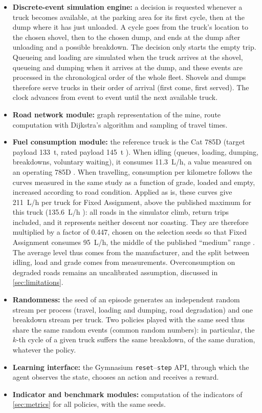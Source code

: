 \documentclass[11pt,a4paper]{article}
\newif\ifrevmarks
\newcommand{\revtag}[1]{\ifrevmarks\textsuperscript{\textcolor{red!70!black}{\scriptsize[#1]}}\fi}
\newcommand{\rev}[2]{\ifrevmarks{\color{revcolor}#2}\revtag{#1}\else#2\fi}
\newenvironment{revbloc}[1]{\par\ifrevmarks\color{revcolor}\noindent\revtag{#1}\ \fi}{\par}
\begin{document}
\begin{revbloc}{M11, A, v3}
\begin{itemize}
  \item \textbf{Discrete-event simulation engine:} a decision is requested whenever a truck becomes available, at the parking area for its first cycle, then at the dump where it has just unloaded. A cycle goes from the truck's location to the chosen shovel, then to the chosen dump, and ends at the dump after unloading and a possible breakdown. The decision only starts the empty trip. Queueing and loading are simulated when the truck arrives at the shovel, queueing and dumping when it arrives at the dump, and these events are processed in the chronological order of the whole fleet. Shovels and dumps therefore serve trucks in their order of arrival (first come, first served). The clock advances from event to event until the next available truck.
  \item \textbf{Road network module:} graph representation of the mine, route computation with Dijkstra's algorithm and sampling of travel times.
  \item \textbf{Fuel consumption module:} \rev{v3, M20}{the reference truck is the Cat 785D (target payload 133~t, rated payload 145~t \cite{Caterpillar2019,Caterpillar785D2025}). When idling (queues, loading, dumping, breakdowns, voluntary waiting), it consumes 11.3~L/h, a value measured on an operating 785D \cite{Kubler2015}. When travelling, consumption per kilometre follows the curves measured in the same study as a function of grade, loaded and empty, increased according to road condition. Applied as is, these curves give 211~L/h per truck for Fixed Assignment, above the published maximum for this truck (135.6~L/h \cite{Caterpillar2019}): all roads in the simulator climb, return trips included, and it represents neither descent nor coasting. They are therefore multiplied by a factor of 0.447, chosen on the selection seeds so that Fixed Assignment consumes 95~L/h, the middle of the published ``medium'' range \cite{Caterpillar2019}. The average level thus comes from the manufacturer, and the split between idling, load and grade comes from measurements. Overconsumption on degraded roads remains an uncalibrated assumption, discussed in \cref{sec:limitations}.}
  \item \textbf{Randomness:} the seed of an episode generates an independent random stream per process (travel, loading and dumping, road degradation) and one breakdown stream per truck. Two policies played with the same seed thus share the same random events (common random numbers): in particular, the $k$-th cycle of a given truck suffers the same breakdown, of the same duration, whatever the policy.
  \item \textbf{Learning interface:} the Gymnasium \texttt{reset}--\texttt{step} API, through which the agent observes the state, chooses an action and receives a reward.
  \item \textbf{Indicator and benchmark modules:} computation of the indicators of \cref{sec:metrics} for all policies, with the same seeds.
\end{itemize}
\end{revbloc}
\end{document}
